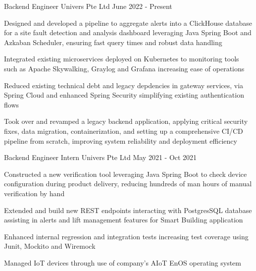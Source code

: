 

\begin{cventries}

  \cventry
    {Backend Engineer} %
    {Univers Pte Ltd} %
    {} %
    {June 2022 - Present} %
    {
      \begin{cvitems} %
        \item {Designed and developed a pipeline to aggregate alerts into a ClickHouse database for a site fault detection and analysis dashboard leveraging Java Spring Boot and Azkaban Scheduler, ensuring fast query times and robust data handling}
        \item {Integrated existing microservices deployed on Kubernetes to monitoring tools such as Apache Skywalking, Graylog and Grafana increasing ease of operations}
        \item {Reduced existing technical debt and legacy depdencies in gateway services, via Spring Cloud and enhanced Spring Security simplifying existing authentication flows}
        \item {Took over and revamped a legacy backend application, applying critical security fixes, data migration, containerization, and setting up a comprehensive CI/CD pipeline from scratch, improving system reliability and deployment efficiency}
      \end{cvitems}
    }

  \cventry
    {Backend Engineer Intern} %
    {Univers Pte Ltd} %
    {} %
    {May 2021 - Oct 2021} %
    {
      \begin{cvitems} %
        \item {Constructed a new verification tool leveraging Java Spring Boot to check device configuration during product delivery, reducing hundreds of man hours of manual verification by hand}
        \item {Extended and build new REST endpoints interacting with PostgresSQL database assisting in alerts and lift management features for Smart Building application}
        \item {Enhanced internal regression and integration tests increasing test coverage using Junit, Mockito and Wiremock}
        \item {Managed IoT devices through use of company's AIoT EnOS operating system}
      \end{cvitems}
    }


\end{cventries}
